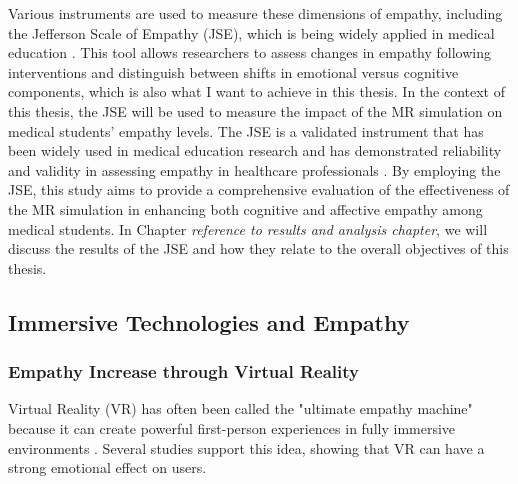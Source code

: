 Various instruments are used to measure these dimensions of empathy, including the Jefferson Scale of Empathy (JSE), which is being widely applied in medical education \cite{Alieldin2024}. This tool allows researchers to assess changes in empathy following interventions and distinguish between shifts in emotional versus cognitive components, which is also what I want to achieve in this thesis. In the context of this thesis, the JSE will be used to measure the impact of the MR simulation on medical students' empathy levels. The JSE is a validated instrument that has been widely used in medical education research and has demonstrated reliability and validity in assessing empathy in healthcare professionals \cite{Hojat2002}. By employing the JSE, this study aims to provide a comprehensive evaluation of the effectiveness of the MR simulation in enhancing both cognitive and affective empathy among medical students. In Chapter \emph{reference to results and analysis chapter}, we will discuss the results of the JSE and how they relate to the overall objectives of this thesis.

\subsection{Immersive Technologies and Empathy}

\subsubsection{Empathy Increase through Virtual Reality}

Virtual Reality (VR) has often been called the "ultimate empathy machine" because it can create powerful first-person experiences in fully immersive environments \cite{Milk2015}. Several studies support this idea, showing that VR can have a strong emotional effect on users.

